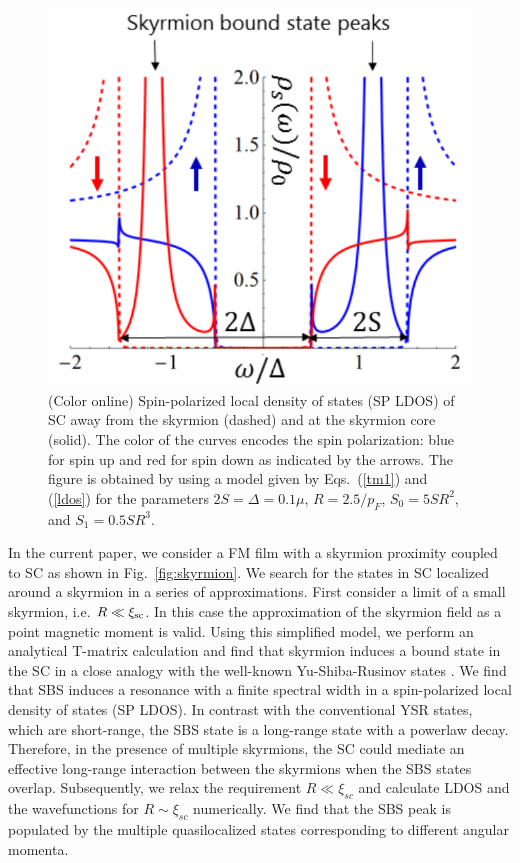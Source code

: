 \documentclass[twocolumn,showpacs,floatfix,longbibliography]{revtex4-1}
\begin{document}
\begin{figure} \centering
	\includegraphics[width=0.7\linewidth]{fig2}
	\caption{(Color online) Spin-polarized local density of states (SP LDOS) of SC away from the skyrmion (dashed) and at the skyrmion core (solid). The color of the curves encodes the spin polarization: blue for spin up and red for spin down as indicated by the arrows. The figure is obtained by using a model given by Eqs.~(\ref{tm1}) and (\ref{ldos}) for the parameters $2S = \Delta = 0.1 \mu$, $R = 2.5/p_F$, $S_0 = 5SR^2$, and $S_1 = 0.5 SR^3$.} \label{fig:LDOS}
\end{figure}


In the current paper, we consider a FM film with a skyrmion proximity coupled to SC as shown in Fig.~\ref{fig:skyrmion}. We search for the states in SC localized around a skyrmion in a series of approximations. First consider a limit of a small skyrmion, i.e. $R\ll \xi_{\rm sc}$.  In this case the approximation of  the skyrmion field as a point magnetic moment is valid. Using this simplified model, we perform an analytical T-matrix calculation and find that skyrmion induces a bound state in the SC in a close analogy with the well-known Yu-Shiba-Rusinov states \cite{Yu,Shiba,Rusinov,Balatsky2006}. We find that SBS induces a resonance with a finite spectral width in a spin-polarized local density of states (SP LDOS). In contrast with the conventional YSR states, which are short-range, the SBS state is a long-range state with a powerlaw decay. Therefore, in the presence of multiple skyrmions, the SC could mediate an effective long-range interaction between the skyrmions \cite{Yao2014,Shytov2009} when the SBS states overlap. Subsequently, we relax the requirement $R\ll \xi_{sc}$ and calculate LDOS and the wavefunctions for $R\sim \xi_{sc}$ numerically. We find that the SBS peak is populated by the multiple quasilocalized states corresponding to different angular momenta.
\end{document}
